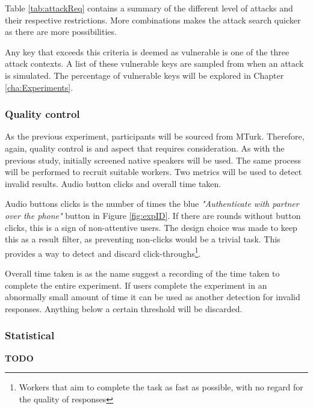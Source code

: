 Table \ref{tab:attackReq} contains a summary of the different level of attacks and their respective restrictions. More combinations makes the attack search quicker as there are more possibilities.

Any key that exceeds this criteria is deemed as vulnerable is one of the three attack contexts. A list of these vulnerable keys are sampled from when an attack is simulated. The percentage of vulnerable keys will be explored in Chapter \ref{cha:Experiments}.

\subsubsection{Quality control}
As the previous experiment, participants will be sourced from MTurk. Therefore, again, quality control is and aspect that requires consideration. As with the previous study, initially screened native speakers will be used. The same process will be performed to recruit suitable workers. Two metrics will be used to detect invalid results. Audio button clicks and overall time taken. 

Audio buttons clicks is the number of times the blue \textit{"Authenticate with partner over the phone"} button in Figure \ref{fig:expID}. If there are rounds without button clicks, this is a sign of non-attentive users. The design choice was made to keep this as a result filter, as preventing non-clicks would be a trivial task. This provides a way to detect and discard click-throughs\footnote{Workers that aim to complete the task as fast as possible, with no regard for the quality of responses}. 

Overall time taken is as the name suggest a recording of the time taken to complete the entire experiment. If users complete the experiment in an abnormally small amount of time it can be used as another detection for invalid responses. Anything below a certain threshold will be discarded.

\subsubsection{Statistical}
\textbf{TODO}